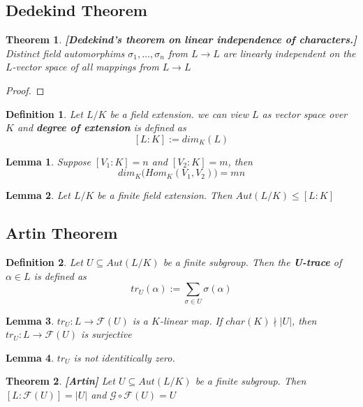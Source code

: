 \documentclass[10pt, oneside]{article}
\newcommand{\G}{\mathcal{G}}
\newcommand{\F}{\mathcal{F}}
\newtheorem{thm}{Theorem}[section]
\newtheorem{defn}{Definition}[section]
\newtheorem{lem}{Lemma}[section]
\begin{document}
	\subsection{Dedekind Theorem}
	\begin{thm}
		\textbf{[Dedekind's theorem on linear independence of characters.]}
		Distinct field automorphims \(\sigma_1, \dots , \sigma_n\) from $L \to L$ are linearly independent on the $L$-vector space of all mappings from $L \to L$ 

	\end{thm}
	\begin{proof}
		
	\end{proof}
\begin{defn}
	Let $L/K$ be a field extension. we can view $L$ as vector space over $K$ and \textbf{degree of extension} is defined as \[[L:K] := 
	dim_K(L)\] 

\end{defn}
\begin{lem}
	Suppose $[V_1:K] = n$ and $[V_2 :K] = m$, then \[dim_K\big(Hom_K(V_1, V_2)\big) = mn\]
\end{lem}

\begin{lem}
		Let $L/K$ be a finite field extension. Then $Aut(L/K) \le [L:K]$
	\end{lem}

\subsection{Artin Theorem}
\begin{defn}
	Let $U \subseteq Aut(L/K)$ be a finite subgroup. Then the \textbf{U-trace} of $\alpha \in L$ is defined as \[tr_U({\alpha}) := \sum_{\sigma \in U} \sigma(\alpha) \]
\end{defn}

\begin{lem}
	$tr_U : L \to \F(U)$ is a $K$-linear map. If $char(K) \nmid |U|$, then $tr_U:L \to \F(U)$ is surjective
\end{lem}
\begin{lem}
	$tr_U$ is not identitically zero.
\end{lem}

\begin{thm}
\textbf{[Artin]}
Let $U \subseteq Aut(L/K)$ be a finite subgroup. Then $[L : \F(U)] = |U|$ and $\G \circ \F (U)= U$ 

\end{thm}
\end{document}
